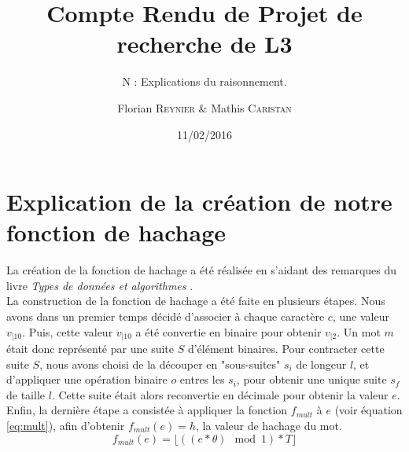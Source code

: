 \documentclass[final,twoside,article,10pt]{scrartcl}
\begin{document}
%
\title{Compte Rendu de Projet de recherche de L3}
\subtitle{N : Explications du raisonnement.}
\author{Florian \textsc{Reynier} \& Mathis \textsc{Caristan}}
%
\date{11/02/2016}

\maketitle

\section{Explication de la création de notre fonction de hachage}
    La création de la fonction de hachage a été réalisée en s'aidant des remarques du livre \emph{Types de données et algorithmes} \cite{soria}.\\
    La construction de la fonction de hachage a été faite en plusieurs étapes. Nous avons dans un premier temps décidé d'associer à chaque caractère $c$, une valeur $v_{|10}$. Puis, cette valeur $v_{|10}$ a été convertie en binaire pour obtenir $v_{|2}$. Un mot $m$ était donc représenté par une suite $S$ d'élément binaires. Pour contracter cette suite $S$, nous avons choisi de la découper en "sous-suites" $s_i$ de longeur $l$, et d'appliquer une opération binaire $o$ entres les $s_i$, pour obtenir une unique suite $s_f$ de taille $l$. Cette suite était alors reconvertie en décimale pour obtenir la valeur $e$. Enfin, la dernière étape a consistée à appliquer la fonction $f_{mult}$ à $e$ (voir équation \ref{eq:mult}), afin d'obtenir $f_{mult}(e) = h$, la valeur de hachage du mot.
    \begin{equation}
        \label{eq:mult}
        f_{mult}(e) = \lfloor ( (e*\theta) \mod 1) * T \rfloor
    \end{equation}
\end{document}
